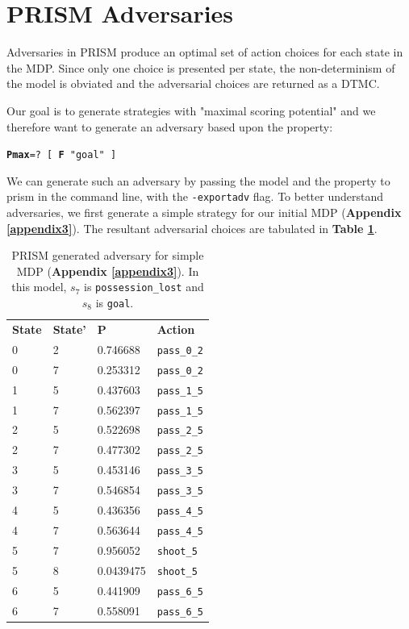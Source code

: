 \documentclass{l4proj}
\begin{document}
\section{PRISM Adversaries}

Adversaries in PRISM \cite{prsmlang} produce an optimal set of action choices for each state in the MDP. Since only one choice is presented per state, the non-determinism of the model is obviated and the adversarial choices are returned as a DTMC. 

Our goal is to generate strategies with "maximal scoring potential" and we therefore want to generate an adversary based upon the property:

\begin{center}
    \texttt{\textbf{Pmax}=? [ \textbf{F} "goal" ]}
\end{center}

We can generate such an adversary by passing the model and the property to prism in the command line, with the \texttt{-exportadv} flag. To better understand adversaries, we first generate a simple strategy for our initial MDP (\textbf{Appendix \ref{appendix3}}). The resultant adversarial choices are tabulated in \textbf{Table \ref{tab:adv-mdp1}}. 

\begin{table}[h]
\centering
\caption{PRISM generated adversary for simple MDP (\textbf{Appendix \ref{appendix3}}). In this model, $s_7$ is \texttt{possession\_lost} and $s_8$ is \texttt{goal}.}
\begin{tabular}{llll}
\textbf{State} & \textbf{State'} & \textbf{P}         & \textbf{Action}     \\
0     & 2      & 0.746688  & \texttt{pass\_0\_2} \\
0     & 7      & 0.253312  & \texttt{pass\_0\_2} \\
1     & 5      & 0.437603  & \texttt{pass\_1\_5} \\
1     & 7      & 0.562397  & \texttt{pass\_1\_5} \\
2     & 5      & 0.522698  & \texttt{pass\_2\_5} \\
2     & 7      & 0.477302  & \texttt{pass\_2\_5} \\
3     & 5      & 0.453146  & \texttt{pass\_3\_5} \\
3     & 7      & 0.546854  & \texttt{pass\_3\_5} \\
4     & 5      & 0.436356  & \texttt{pass\_4\_5} \\
4     & 7      & 0.563644  & \texttt{pass\_4\_5} \\
5     & 7      & 0.956052  & \texttt{shoot\_5}   \\
5     & 8      & 0.0439475 & \texttt{shoot\_5}   \\
6     & 5      & 0.441909  & \texttt{pass\_6\_5} \\
6     & 7      & 0.558091  & \texttt{pass\_6\_5}
\end{tabular}
\label{tab:adv-mdp1}
\end{table}
\end{document}
